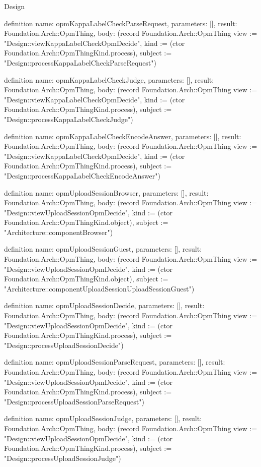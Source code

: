 \begin{lexlean}{Design}
\begin{semanticmodule}
definition{
  name: opmKappaLabelCheckParseRequest,
  parameters: [],
  result: Foundation.Arch::OpmThing,
  body: (record Foundation.Arch::OpmThing {view := "Design::viewKappaLabelCheckOpmDecide", kind := (ctor Foundation.Arch::OpmThingKind.process), subject := "Design::processKappaLabelCheckParseRequest"})
}

definition{
  name: opmKappaLabelCheckJudge,
  parameters: [],
  result: Foundation.Arch::OpmThing,
  body: (record Foundation.Arch::OpmThing {view := "Design::viewKappaLabelCheckOpmDecide", kind := (ctor Foundation.Arch::OpmThingKind.process), subject := "Design::processKappaLabelCheckJudge"})
}

definition{
  name: opmKappaLabelCheckEncodeAnswer,
  parameters: [],
  result: Foundation.Arch::OpmThing,
  body: (record Foundation.Arch::OpmThing {view := "Design::viewKappaLabelCheckOpmDecide", kind := (ctor Foundation.Arch::OpmThingKind.process), subject := "Design::processKappaLabelCheckEncodeAnswer"})
}

definition{
  name: opmUploadSessionBrowser,
  parameters: [],
  result: Foundation.Arch::OpmThing,
  body: (record Foundation.Arch::OpmThing {view := "Design::viewUploadSessionOpmDecide", kind := (ctor Foundation.Arch::OpmThingKind.object), subject := "Architecture::componentBrowser"})
}

definition{
  name: opmUploadSessionGuest,
  parameters: [],
  result: Foundation.Arch::OpmThing,
  body: (record Foundation.Arch::OpmThing {view := "Design::viewUploadSessionOpmDecide", kind := (ctor Foundation.Arch::OpmThingKind.object), subject := "Architecture::componentUploadSessionUploadSessionGuest"})
}

definition{
  name: opmUploadSessionDecide,
  parameters: [],
  result: Foundation.Arch::OpmThing,
  body: (record Foundation.Arch::OpmThing {view := "Design::viewUploadSessionOpmDecide", kind := (ctor Foundation.Arch::OpmThingKind.process), subject := "Design::processUploadSessionDecide"})
}

definition{
  name: opmUploadSessionParseRequest,
  parameters: [],
  result: Foundation.Arch::OpmThing,
  body: (record Foundation.Arch::OpmThing {view := "Design::viewUploadSessionOpmDecide", kind := (ctor Foundation.Arch::OpmThingKind.process), subject := "Design::processUploadSessionParseRequest"})
}

definition{
  name: opmUploadSessionJudge,
  parameters: [],
  result: Foundation.Arch::OpmThing,
  body: (record Foundation.Arch::OpmThing {view := "Design::viewUploadSessionOpmDecide", kind := (ctor Foundation.Arch::OpmThingKind.process), subject := "Design::processUploadSessionJudge"})
}


\end{semanticmodule}
\end{lexlean}
